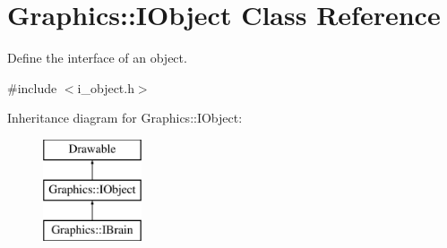 \hypertarget{class_graphics_1_1_i_object}{}\section{Graphics\+:\+:I\+Object Class Reference}
\label{class_graphics_1_1_i_object}


Define the interface of an object.  




{\ttfamily \#include $<$i\+\_\+object.\+h$>$}

Inheritance diagram for Graphics\+:\+:I\+Object\+:\begin{figure}[H]
\begin{center}
\leavevmode
\includegraphics[height=3.000000cm]{class_graphics_1_1_i_object}
\end{center}
\end{figure}
